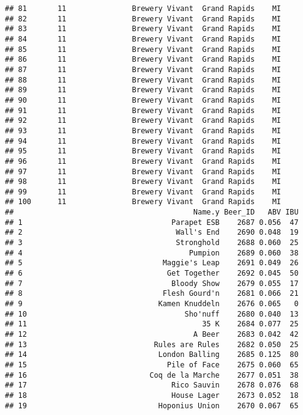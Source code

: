 \documentclass[
]{article}
\begin{document}
\begin{verbatim}
## 81       11               Brewery Vivant  Grand Rapids    MI
## 82       11               Brewery Vivant  Grand Rapids    MI
## 83       11               Brewery Vivant  Grand Rapids    MI
## 84       11               Brewery Vivant  Grand Rapids    MI
## 85       11               Brewery Vivant  Grand Rapids    MI
## 86       11               Brewery Vivant  Grand Rapids    MI
## 87       11               Brewery Vivant  Grand Rapids    MI
## 88       11               Brewery Vivant  Grand Rapids    MI
## 89       11               Brewery Vivant  Grand Rapids    MI
## 90       11               Brewery Vivant  Grand Rapids    MI
## 91       11               Brewery Vivant  Grand Rapids    MI
## 92       11               Brewery Vivant  Grand Rapids    MI
## 93       11               Brewery Vivant  Grand Rapids    MI
## 94       11               Brewery Vivant  Grand Rapids    MI
## 95       11               Brewery Vivant  Grand Rapids    MI
## 96       11               Brewery Vivant  Grand Rapids    MI
## 97       11               Brewery Vivant  Grand Rapids    MI
## 98       11               Brewery Vivant  Grand Rapids    MI
## 99       11               Brewery Vivant  Grand Rapids    MI
## 100      11               Brewery Vivant  Grand Rapids    MI
##                                         Name.y Beer_ID   ABV IBU
## 1                                  Parapet ESB    2687 0.056  47
## 2                                   Wall's End    2690 0.048  19
## 3                                   Stronghold    2688 0.060  25
## 4                                      Pumpion    2689 0.060  38
## 5                                Maggie's Leap    2691 0.049  26
## 6                                 Get Together    2692 0.045  50
## 7                                  Bloody Show    2679 0.055  17
## 8                                Flesh Gourd'n    2681 0.066  21
## 9                               Kamen Knuddeln    2676 0.065   0
## 10                                    Sho'nuff    2680 0.040  13
## 11                                        35 K    2684 0.077  25
## 12                                      A Beer    2683 0.042  42
## 13                             Rules are Rules    2682 0.050  25
## 14                              London Balling    2685 0.125  80
## 15                                Pile of Face    2675 0.060  65
## 16                            Coq de la Marche    2677 0.051  38
## 17                                 Rico Sauvin    2678 0.076  68
## 18                                 House Lager    2673 0.052  18
## 19                              Hoponius Union    2670 0.067  65

\end{verbatim}
\end{document}
